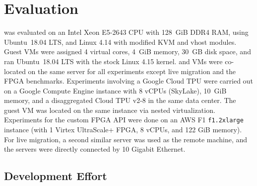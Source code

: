 
\section{Evaluation}
\label{s:eval}

\AvA was evaluated on an Intel Xeon E5-2643 CPU with 128~GiB DDR4 RAM, using
Ubuntu~18.04 LTS, and Linux 4.14 with modified KVM and vhost modules. Guest
VMs were assigned 4 virtual cores, 4~GiB memory, 30~GB disk space, and ran
Ubuntu~18.04 LTS with the stock Linux 4.15 kernel. \workers and VMs were
co-located on the same server for all experiments except live migration and
the FPGA benchmarks. Experiments involving a Google Cloud TPU were carried out
on a Google Compute Engine instance with 8 vCPUs (SkyLake), 10~GiB memory, and
a disaggregated Cloud TPU v2-8 in the same data center. The guest VM was
located on the same instance via nested virtualization. Experiments for the
custom FPGA API were done on an AWS F1 \lstinline|f1.2xlarge| instance (with 1
Virtex UltraScale+ FPGA, 8 vCPUs, and 122 GiB memory). For live migration, a
second similar server was used as the remote machine, and the servers were
directly connected by 10 Gigabit Ethernet.

\subsection{Development Effort}
\label{s:eval_effort}

